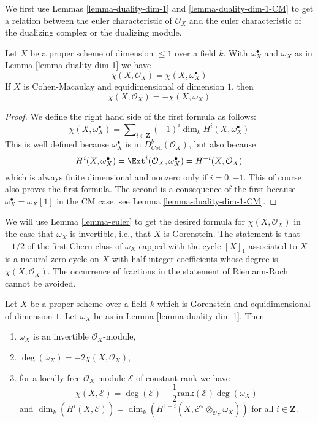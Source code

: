 \medskip\noindent
We first use Lemmas \ref{lemma-duality-dim-1} and \ref{lemma-duality-dim-1-CM}
to get a relation between the euler
characteristic of $\mathcal{O}_X$ and the euler characteristic
of the dualizing complex or the dualizing module.

\begin{lemma}
\label{lemma-euler}
Let $X$ be a proper scheme of dimension $\leq 1$ over a field $k$.
With $\omega_X^\bullet$ and $\omega_X$ as in Lemma \ref{lemma-duality-dim-1}
we have
$$
\chi(X, \mathcal{O}_X) = \chi(X, \omega_X^\bullet)
$$
If $X$ is Cohen-Macaulay and equidimensional of dimension $1$, then
$$
\chi(X, \mathcal{O}_X) = - \chi(X, \omega_X)
$$
\end{lemma}

\begin{proof}
We define the right hand side of the first formula as follows:
$$
\chi(X, \omega_X^\bullet) =
\sum\nolimits_{i \in \mathbf{Z}} (-1)^i\dim_k H^i(X, \omega_X^\bullet)
$$
This is well defined because $\omega_X^\bullet$ is in
$D^b_{\textit{Coh}}(\mathcal{O}_X)$, but also because
$$
H^i(X, \omega_X^\bullet) =
\Ext^i(\mathcal{O}_X, \omega_X^\bullet) =
H^{-i}(X, \mathcal{O}_X)
$$
which is always finite dimensional and nonzero only if $i = 0, -1$.
This of course also proves the first formula. The second is a consequence
of the first because $\omega_X^\bullet = \omega_X[1]$ in the CM case, see
Lemma \ref{lemma-duality-dim-1-CM}.
\end{proof}

\noindent
We will use Lemma \ref{lemma-euler} to get the desired formula for
$\chi(X, \mathcal{O}_X)$ in the case that $\omega_X$ is
invertible, i.e., that $X$ is Gorenstein.
The statement is that $-1/2$ of the first Chern class of $\omega_X$
capped with the cycle $[X]_1$ associated to $X$ is a natural zero
cycle on $X$ with half-integer coefficients whose degree is
$\chi(X, \mathcal{O}_X)$.
The occurrence of fractions in the statement of Riemann-Roch cannot
be avoided.

\begin{lemma}
\label{lemma-rr}
Let $X$ be a proper scheme over a field $k$ which is Gorenstein and
equidimensional of dimension $1$. Let $\omega_X$ be as in
Lemma \ref{lemma-duality-dim-1}. Then
\begin{enumerate}
\item $\omega_X$ is an invertible $\mathcal{O}_X$-module,
\item $\deg(\omega_X) = -2\chi(X, \mathcal{O}_X)$,
\item for a locally free $\mathcal{O}_X$-module $\mathcal{E}$
of constant rank we have
$$
\chi(X, \mathcal{E}) = \deg(\mathcal{E}) -
\textstyle{\frac{1}{2}} \text{rank}(\mathcal{E}) \deg(\omega_X)
$$
and $\dim_k(H^i(X, \mathcal{E})) =
\dim_k(H^{1 - i}(X, \mathcal{E}^\vee \otimes_{\mathcal{O}_X} \omega_X))$
for all $i \in \mathbf{Z}$.
\end{enumerate}
\end{lemma}

